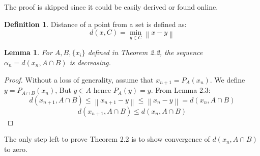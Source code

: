 \documentclass{amsart}
\newtheorem{lemma}[theorem]{Lemma}
\theoremstyle{definition}
\newtheorem{definition}[theorem]{Definition}
\theoremstyle{remark}
\numberwithin{equation}{section}
\newcommand\norm[1]{\left\lVert#1\right\rVert}
\begin{document}
The proof is skipped since it could be easily derived or found online.

\begin{definition}
Distance of a point from a set is defined as:
\[
d(x,C) = \min_{y \in C} \norm{x-y}
\]
\end{definition}
\begin{lemma}
For $A,B,\{x_i\}$ defined in Theorem 2.2, the sequence $\alpha_n= d(x_n, A\cap B)$ is decreasing.
\end{lemma}
\begin{proof}
Without a loss of generality, assume that $x_{n+1}=P_A(x_n)$. We define $y=P_{A\cap B}(x_n)$, But $y\in A$ hence $P_A(y)=y$. From Lemma 2.3:
\[
d(x_{n+1},A\cap B)\leq \norm{x_{n+1}-y}\leq \norm{x_n-y}=d(x_n,A\cap B) 
\]
\[
d(x_{n+1},A\cap B)\leq d(x_n,A\cap B)
\]
\end{proof}

The only step left to prove Theorem 2.2 is to show convergence of $d(x_n,A\cap B)$ to zero.
\end{document}
